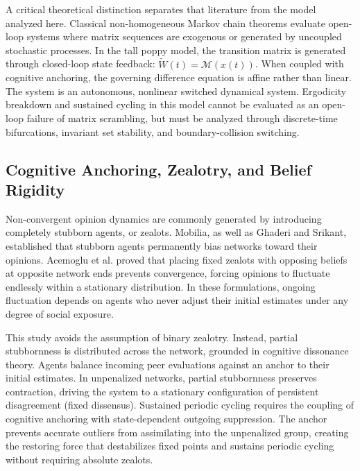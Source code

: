 A critical theoretical distinction separates that literature from the model analyzed here\cite{hajnal1958weak}. Classical non-homogeneous Markov chain theorems evaluate open-loop systems where matrix sequences are exogenous or generated by uncoupled stochastic processes\cite{hajnal1958weak}. In the tall poppy model, the transition matrix is generated through closed-loop state feedback: $\tilde{W}(t) = \mathcal{M}(x(t))$\cite{hajnal1958weak}. When coupled with cognitive anchoring, the governing difference equation is affine rather than linear\cite{acemoglu2013opinion,hajnal1958weak}. The system is an autonomous, nonlinear switched dynamical system\cite{hajnal1958weak}. Ergodicity breakdown and sustained cycling in this model cannot be evaluated as an open-loop failure of matrix scrambling, but must be analyzed through discrete-time bifurcations, invariant set stability, and boundary-collision switching\cite{acemoglu2013opinion,hajnal1958weak}.

\subsection{Cognitive Anchoring, Zealotry, and Belief Rigidity}
Non-convergent opinion dynamics are commonly generated by introducing completely stubborn agents, or zealots\cite{degroot1974reaching,hajnal1958weak}. Mobilia, as well as Ghaderi and Srikant, established that stubborn agents permanently bias networks toward their opinions\cite{degroot1974reaching}. Acemoglu et al. proved that placing fixed zealots with opposing beliefs at opposite network ends prevents convergence, forcing opinions to fluctuate endlessly within a stationary distribution\cite{degroot1974reaching,hajnal1958weak}. In these formulations, ongoing fluctuation depends on agents who never adjust their initial estimates under any degree of social exposure\cite{degroot1974reaching,hajnal1958weak}.

This study avoids the assumption of binary zealotry\cite{degroot1974reaching}. Instead, partial stubbornness is distributed across the network, grounded in cognitive dissonance theory\cite{degroot1974reaching}. Agents balance incoming peer evaluations against an anchor to their initial estimates\cite{degroot1974reaching}. In unpenalized networks, partial stubbornness preserves contraction, driving the system to a stationary configuration of persistent disagreement (fixed dissensus)\cite{acemoglu2013opinion}. Sustained periodic cycling requires the coupling of cognitive anchoring with state-dependent outgoing suppression\cite{degroot1974reaching,acemoglu2013opinion}. The anchor prevents accurate outliers from assimilating into the unpenalized group, creating the restoring force that destabilizes fixed points and sustains periodic cycling without requiring absolute zealots\cite{degroot1974reaching,acemoglu2013opinion,hajnal1958weak}.

